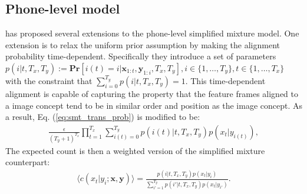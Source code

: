 \documentclass[journal]{IEEEtran}
\begin{document}
\subsection{Phone-level model}
\cite{Brown92} has proposed several extensions to the phone-level simplified mixture model. One extension is to relax the uniform prior assumption by making the alignment probability time-dependent. Specifically they introduce a set of parameters $p(i|t, T_x, T_y) := \mathbf{Pr}[i(t) = i|\mathbf x_{1:t}, \mathbf y_{1:i}, T_x, T_y], i\in \{1,\ldots,T_y\}, t\in \{1,\ldots,T_x\}$ with the constraint that $\sum_{i=0}^{T_y} p(i|t, T_x, T_y) = 1$. This time-dependent alignment is capable of capturing the property that the feature frames aligned to a image concept tend to be in similar order and position as the image concept. As a result, Eq. (\ref{eq:smt_trans_prob}) is modified to be:
\begin{align}
    \frac{\epsilon}{(T_y+1)^{T_x}}\prod_{t=1}^{T_x} \sum_{i(t)=0}^{T_y}p(i(t)|t, T_x, T_y) p(x_t|y_{i(t)}),
\end{align}
The expected count is then a weighted version of the simplified mixture counterpart:
\begin{align}
\label{eq:expected_count_ibm2}
    \langle c(x_t|y_i; \mathbf x, \mathbf y) \rangle = \frac{p(i|t, T_x, T_y) p(x_t|y_i)}{\sum_{i'=1}^{T_y}p(i'|t, T_x, T_y) p(x_t|y_{i'})}.
\end{align}

\end{document}
